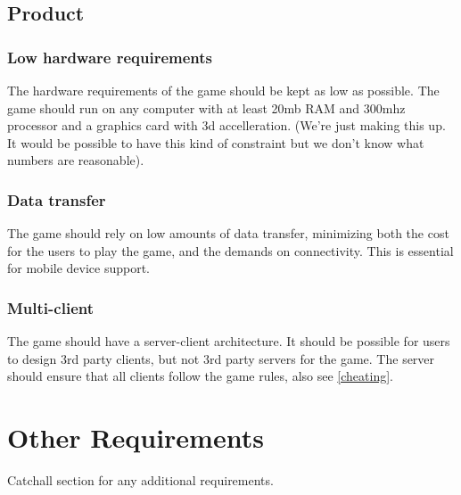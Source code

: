 \documentclass[a4paper,10pt]{article}
\begin{document}
\subsection{Product}
\subsubsection{Low hardware requirements}
\label{hwreq}
The hardware requirements of the game should be kept as low as possible. The game should run on any computer with at least 20mb RAM and 300mhz processor and a graphics card with 3d accelleration. (We're just making this up. It would be possible to have this kind of constraint but we don't know what numbers are reasonable).

\subsubsection{Data transfer}
The game should rely on low amounts of data transfer, minimizing both the cost for the users to play the game, and the demands on connectivity. This is essential for mobile device support.

\subsubsection{Multi-client}
The game should have a server-client architecture. It should be possible for users to design 3rd party clients, but not 3rd party servers for the game. The server should ensure that all clients follow the game rules, also see \ref{cheating}.

\section{Other Requirements}
Catchall section for any additional requirements.
\end{document}
